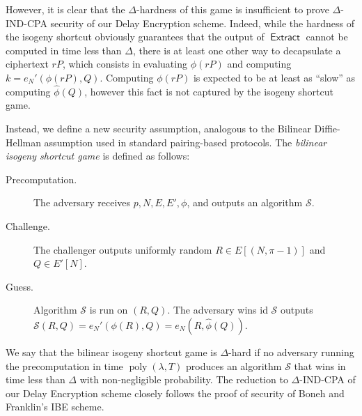 \documentclass{llncs}
\DeclareMathOperator{\poly}{poly}
\DeclareMathOperator{\Extract}{\mathsf{Extract}}
\begin{document}
However, it is clear that the $\Delta$-hardness of this game is
insufficient to prove $\Delta$-IND-CPA security of our Delay
Encryption scheme. %
Indeed, while the hardness of the isogeny shortcut obviously
guarantees that the output of $\Extract$ cannot be computed in time
less than $\Delta$, there is at least one other way to decapsulate a
ciphertext $rP$, which consists in evaluating $\phi(rP)$ and computing
$k=e_N'(\phi(rP), Q)$. %
Computing $\phi(rP)$ is expected to be at least as ``slow'' as
computing $\hat\phi(Q)$, however this fact is not captured by the
isogeny shortcut game.

Instead, we define a new security assumption, analogous to the
Bilinear Diffie-Hellman assumption used in standard pairing-based
protocols. %
The \emph{bilinear isogeny shortcut game} is defined as follows:

\begin{description}
\item[Precomputation.] The adversary receives $p,N,E,E',\phi$, and
  outputs an algorithm $\mathcal{S}$.
\item[Challenge.] The challenger outputs uniformly random
  $R\in E[(N,\pi-1)]$ and $Q\in E'[N]$.
\item[Guess.] Algorithm $\mathcal{S}$ is run on $(R,Q)$. The adversary
  wins id $\mathcal{S}$ outputs
  $\mathcal{S}(R,Q) = e_N'(\phi(R),Q) = e_N(R,\hat\phi(Q))$.
\end{description}

We say that the bilinear isogeny shortcut game is $\Delta$-hard if no
adversary running the precomputation in time $\poly(\lambda,T)$
produces an algorithm $\mathcal{S}$ that wins in time less than
$\Delta$ with non-negligible probability. %
The reduction to $\Delta$-IND-CPA of our Delay Encryption scheme
closely follows the proof of security of Boneh and Franklin's IBE
scheme.
\end{document}
